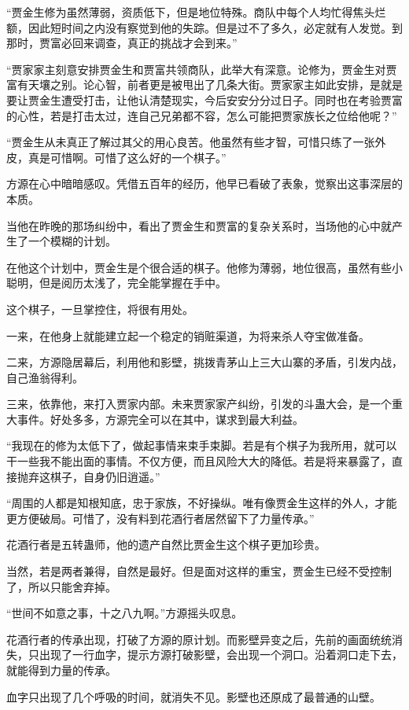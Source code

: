 \begin{this_body}
“贾金生修为虽然薄弱，资质低下，但是地位特殊。商队中每个人均忙得焦头烂额，因此短时间之内没有察觉到他的失踪。但是过不了多久，必定就有人发觉。到那时，贾富必回来调查，真正的挑战才会到来。”

“贾家家主刻意安排贾金生和贾富共领商队，此举大有深意。论修为，贾金生对贾富有天壤之别。论心智，前者更是被甩出了几条大街。贾家家主如此安排，是就是要让贾金生遭受打击，让他认清楚现实，今后安安分分过日子。同时也在考验贾富的心性，若是打击太过，连自己兄弟都不容，怎么可能把贾家族长之位给他呢？”

“贾金生从未真正了解过其父的用心良苦。他虽然有些才智，可惜只练了一张外皮，真是可惜啊。可惜了这么好的一个棋子。”

方源在心中暗暗感叹。凭借五百年的经历，他早已看破了表象，觉察出这事深层的本质。

当他在昨晚的那场纠纷中，看出了贾金生和贾富的复杂关系时，当场他的心中就产生了一个模糊的计划。

在他这个计划中，贾金生是个很合适的棋子。他修为薄弱，地位很高，虽然有些小聪明，但是阅历太浅了，完全能掌握在手中。

这个棋子，一旦掌控住，将很有用处。

一来，在他身上就能建立起一个稳定的销赃渠道，为将来杀人夺宝做准备。

二来，方源隐居幕后，利用他和影壁，挑拨青茅山上三大山寨的矛盾，引发内战，自己渔翁得利。

三来，依靠他，来打入贾家内部。未来贾家家产纠纷，引发的斗蛊大会，是一个重大事件。好处多多，方源完全可以在其中，谋求到最大利益。

“我现在的修为太低下了，做起事情来束手束脚。若是有个棋子为我所用，就可以干一些我不能出面的事情。不仅方便，而且风险大大的降低。若是将来暴露了，直接抛弃这棋子，自身仍旧逍遥。”

“周围的人都是知根知底，忠于家族，不好操纵。唯有像贾金生这样的外人，才能更方便破局。可惜了，没有料到花酒行者居然留下了力量传承。”

花酒行者是五转蛊师，他的遗产自然比贾金生这个棋子更加珍贵。

当然，若是两者兼得，自然是最好。但是面对这样的重宝，贾金生已经不受控制了，所以只能舍弃掉。

“世间不如意之事，十之八九啊。”方源摇头叹息。

花酒行者的传承出现，打破了方源的原计划。而影壁异变之后，先前的画面统统消失，只出现了一行血字，提示方源打破影壁，会出现一个洞口。沿着洞口走下去，就能得到力量的传承。

血字只出现了几个呼吸的时间，就消失不见。影壁也还原成了最普通的山壁。


\end{this_body}
